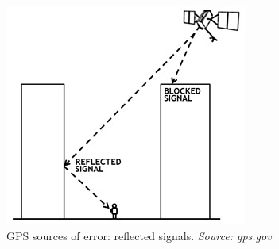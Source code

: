 \begin{figure}
    \includegraphics[scale=0.5]{figures/gps-reflect.jpg}
\caption{GPS sources of error: reflected signals. \textit{Source: gps.gov}}
\label{fig:gps:reflect}
\end{figure}
